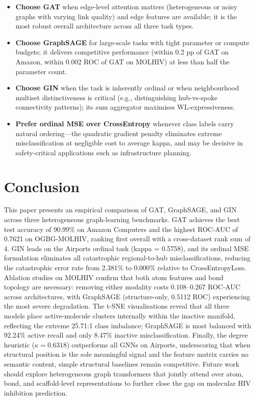 \begin{itemize}
    \item \textbf{Choose GAT} when edge-level attention matters (heterogeneous or noisy graphs with varying link quality) and edge features are available; it is the most robust overall architecture across all three task types.
    \item \textbf{Choose GraphSAGE} for large-scale tasks with tight parameter or compute budgets; it delivers competitive performance (within 0.2 pp of GAT on Amazon, within 0.002 ROC of GAT on MOLHIV) at less than half the parameter count.
    \item \textbf{Choose GIN} when the task is inherently ordinal or when neighbourhood multiset distinctiveness is critical (e.g., distinguishing hub-vs-spoke connectivity patterns); its sum aggregator maximises WL-expressiveness.
    \item \textbf{Prefer ordinal MSE over CrossEntropy} whenever class labels carry natural ordering---the quadratic gradient penalty eliminates extreme misclassification at negligible cost to average kappa, and may be decisive in safety-critical applications such as infrastructure planning.
\end{itemize}

\section{Conclusion}

This paper presents an empirical comparison of GAT, GraphSAGE, and GIN across three heterogeneous graph-learning benchmarks. GAT achieves the best test accuracy of 90.99\% on Amazon Computers and the highest ROC-AUC of 0.7621 on OGBG-MOLHIV, ranking first overall with a cross-dataset rank sum of 4. GIN leads on the Airports ordinal task (kappa = 0.5758), and its ordinal MSE formulation eliminates all catastrophic regional-to-hub misclassifications, reducing the catastrophic error rate from 2.381\% to 0.000\% relative to CrossEntropyLoss. Ablation studies on MOLHIV confirm that both atom features and bond topology are necessary: removing either modality costs 0.108--0.267 ROC-AUC across architectures, with GraphSAGE (structure-only, 0.5112 ROC) experiencing the most severe degradation. The t-SNE visualisations reveal that all three models place active-molecule clusters internally within the inactive manifold, reflecting the extreme 25.71:1 class imbalance; GraphSAGE is most balanced with 92.24\% active recall and only 8.47\% inactive misclassification. Finally, the degree heuristic ($\kappa = 0.6318$) outperforms all GNNs on Airports, underscoring that when structural position is the sole meaningful signal and the feature matrix carries no semantic content, simple structural baselines remain competitive. Future work should explore heterogeneous graph transformers that jointly attend over atom, bond, and scaffold-level representations to further close the gap on molecular HIV inhibition prediction.

